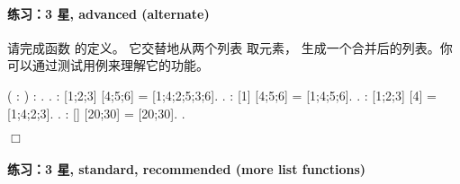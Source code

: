 \documentclass[12pt]{report}
\begin{document}
{{{\paragraph{练习：3 星, advanced (alternate)}



  请完成函数  的定义。
  它交替地从两个列表   取元素，
  生成一个合并后的列表。你可以通过测试用例来理解它的功能。
\begin{coqdoccode}
\coqdocemptyline
\coqdocnoindent
{}  (  : ) : \coqdoceol
\coqdocindent{1.00em}
.\coqdoceol
\coqdocnoindent
{}.\coqdoceol
\coqdocemptyline
\coqdocnoindent
{} :\coqdoceol
\coqdocindent{1.00em}
 [1;2;3] [4;5;6] = [1;4;2;5;3;6].\coqdoceol
\coqdocnoindent
{}.\coqdoceol
\coqdocemptyline
\coqdocnoindent
{} :\coqdoceol
\coqdocindent{1.00em}
 [1] [4;5;6] = [1;4;5;6].\coqdoceol
\coqdocnoindent
{}.\coqdoceol
\coqdocemptyline
\coqdocnoindent
{} :\coqdoceol
\coqdocindent{1.00em}
 [1;2;3] [4] = [1;4;2;3].\coqdoceol
\coqdocnoindent
{}.\coqdoceol
\coqdocemptyline
\coqdocnoindent
{} :\coqdoceol
\coqdocindent{1.00em}
 [] [20;30] = [20;30].\coqdoceol
\coqdocnoindent
{}.\coqdoceol
\end{coqdoccode}
\ensuremath{\Box} \paragraph{练习：3 星, standard, recommended (more list functions)}

}}}
\end{document}
